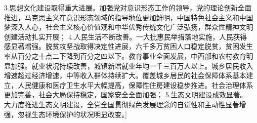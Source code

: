 \begin{enumerate}
3.思想文化建设取得重大进展。加强党对意识形态工作的领导，党的理论创新全面推进，马克思主义在意识形态领域的指导地位更加鲜明，中国特色社会主义和中国梦深入人心，社会主义核心价值观和中华优秀传统文化广泛弘扬，群众性精神文明创建活动扎实开展；
4.人民生活不断改善。一大批惠民举措落地实施，人民获得感显著增强。脱贫攻坚战取得决定性进展，六千多万贫困人口稳定脱贫，贫困发生率从百分之十点二下降到百分之四以下。教育事业全面发展，中西部和农村教育明显加强。就业状况持续改善，城镇新增就业年均一千三百万人以上。城乡居民收入增速超过经济增速，中等收入群体持续扩大。覆盖城乡居民的社会保障体系基本建立，人民健康和医疗卫生水平大幅提高，保障性住房建设稳步推进。社会治理体系更加完善，社会大局保持稳定，国家安全全面加强；
5.生态文明建设成效显著。大力度推进生态文明建设，全党全国贯彻绿色发展理念的自觉性和主动性显著增强，忽视生态环境保护的状况明显改变。]
\end{enumerate}
